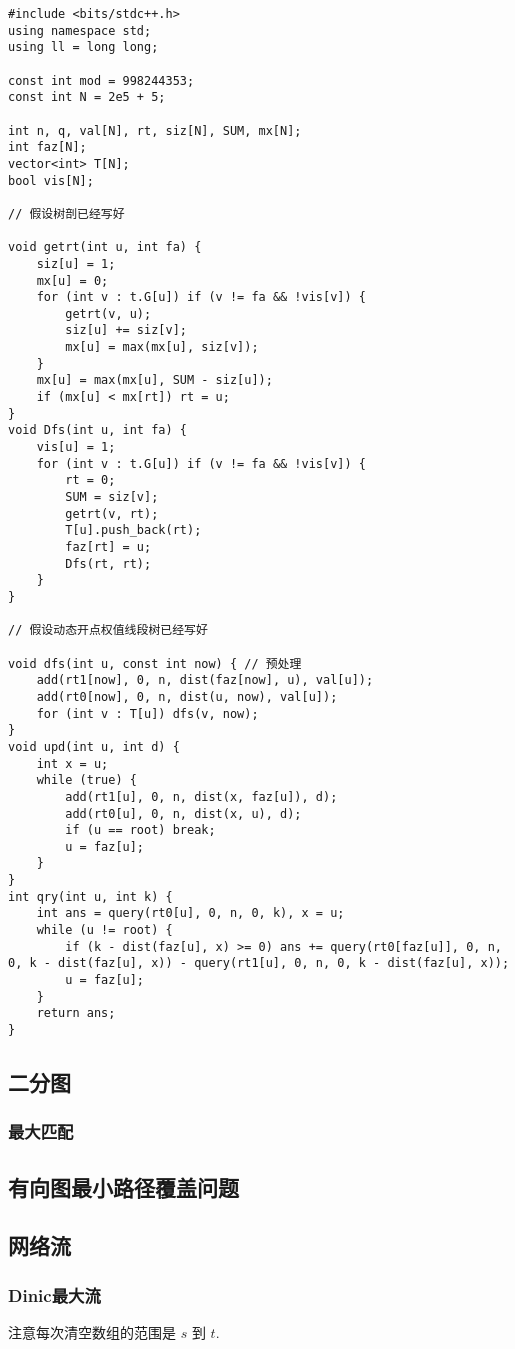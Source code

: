 \documentclass[a4paper]{article}
\begin{document}
\begin{lstlisting}
#include <bits/stdc++.h>
using namespace std;
using ll = long long;

const int mod = 998244353;
const int N = 2e5 + 5;

int n, q, val[N], rt, siz[N], SUM, mx[N];
int faz[N];
vector<int> T[N];
bool vis[N];

// 假设树剖已经写好

void getrt(int u, int fa) {
	siz[u] = 1;
	mx[u] = 0;
	for (int v : t.G[u]) if (v != fa && !vis[v]) {
		getrt(v, u);
		siz[u] += siz[v];
		mx[u] = max(mx[u], siz[v]);
	}
	mx[u] = max(mx[u], SUM - siz[u]);
	if (mx[u] < mx[rt]) rt = u;
}
void Dfs(int u, int fa) {
	vis[u] = 1;
	for (int v : t.G[u]) if (v != fa && !vis[v]) {
		rt = 0;
		SUM = siz[v];
		getrt(v, rt);
		T[u].push_back(rt);
		faz[rt] = u;
		Dfs(rt, rt);
	}
}

// 假设动态开点权值线段树已经写好

void dfs(int u, const int now) { // 预处理
	add(rt1[now], 0, n, dist(faz[now], u), val[u]);
	add(rt0[now], 0, n, dist(u, now), val[u]);
	for (int v : T[u]) dfs(v, now);
}
void upd(int u, int d) {
	int x = u;
	while (true) {
		add(rt1[u], 0, n, dist(x, faz[u]), d);
		add(rt0[u], 0, n, dist(x, u), d);
		if (u == root) break;
		u = faz[u];
	}
}
int qry(int u, int k) {
	int ans = query(rt0[u], 0, n, 0, k), x = u;
	while (u != root) {
		if (k - dist(faz[u], x) >= 0) ans += query(rt0[faz[u]], 0, n, 0, k - dist(faz[u], x)) - query(rt1[u], 0, n, 0, k - dist(faz[u], x));
		u = faz[u];
	}
	return ans;
}
\end{lstlisting}

\subsection{二分图}
\subsubsection*{最大匹配}


\subsection{有向图最小路径覆盖问题}


\subsection{网络流}
\subsubsection{Dinic最大流}
注意每次清空数组的范围是 $s$ 到 $t$.

\end{document}
